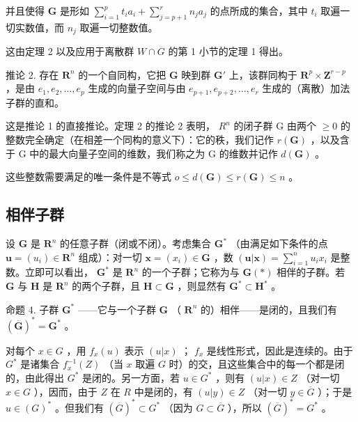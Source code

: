 并且使得 \(\mathbf{G}\) 是形如 \(\sum_{i=1}^{p} t_i a_i + \sum_{j=p+1}^{r} n_j a_j\) 的点所成的集合，其中 \(t_i\) 取遍一切实数值，而 \(n_j\) 取遍一切整数值。

这由定理 2 以及应用于离散群 \(W \cap G\) 的第 1 小节的定理 1 得出。

推论 2. 存在 \(\mathbf{R}^n\) 的一个自同构，它把 \(\mathbf{G}\) 映到群 \(\mathbf{G}'\) 上，该群同构于 \(\mathbf{R}^p \times \mathbf{Z}^{r-p}\) ，是由 \(e_1, e_2, \ldots, e_p\) 生成的向量子空间与由 \(e_{p+1}, e_{p+2}, \ldots, e_r\) 生成的（离散）加法子群的直和。

这是推论 1 的直接推论。定理 2 的推论 2 表明， \(R^{n}\) 的闭子群 G 由两个 \(\geqslant 0\) 的整数完全确定（在相差一个同构的意义下）：它的秩，我们记作 \(r(\mathbf{G})\) ，以及含于 G 中的最大向量子空间的维数，我们称之为 G 的维数并记作 \(d(\mathbf{G})\) 。

这些整数需要满足的唯一条件是不等式 \(o \leqslant d(\mathbf{G}) \leqslant r(\mathbf{G}) \leqslant n\) 。

\subsection{相伴子群}

设 \(\mathbf{G}\) 是 \(\mathbf{R}^n\) 的任意子群（闭或不闭）。考虑集合 \(\mathbf{G}^*\) （由满足如下条件的点 \(\boldsymbol{u} = (u_i) \in \mathbf{R}^n\) 组成）：对一切 \(\boldsymbol{x} = (x_i) \in \mathbf{G}\) ，数 \((\boldsymbol{u}| \boldsymbol{x}) = \sum_{i=1}^{n} u_i x_i\) 是整数。立即可以看出， \(\mathbf{G}^*\) 是 \(\mathbf{R}^n\) 的一个子群；它称为与 \(\mathbf{G}(*)\) 相伴的子群。若 \(\mathbf{G}\) 与 \(\mathbf{H}\) 是 \(\mathbf{R}^n\) 的两个子群，且 \(\mathbf{H} \subset \mathbf{G}\) ，则显然有 \(\mathbf{G}^* \subset \mathbf{H}^*\) 。

命题 4. 子群 \(\mathbf{G}^*\) ——它与一个子群 \(\mathbf{G}\) （ \(\mathbf{R}^n\) 的）相伴——是闭的，且我们有 \((\overline{\mathbf{G}})^* = \mathbf{G}^*\) 。

对每个 \(x \in G\) ，用 \(f_x(u)\) 表示 \((u|x)\) ； \(f_x\) 是线性形式，因此是连续的。由于 \(G^*\) 是诸集合 \(f_x^{-1}(Z)\) （当 \(x\) 取遍 \(G\) 时）的交，且这些集合中的每一个都是闭的，由此得出 \(G^*\) 是闭的。另一方面，若 \(u \in G^*\) ，则有 \((u|x) \in Z\) （对一切 \(x \in G\) ），因而，由于 \(Z\) 在 \(R\) 中是闭的，有 \((u|y) \in Z\) （对一切 \(y \in \overline{G}\) ）；于是 \(u \in (G)^*\) 。但我们有 \((\overline{G})^* \subset G^*\) （因为 \(G \subset \overline{G}\) ），所以 \((\overline{G})^* = G^*\) 。

